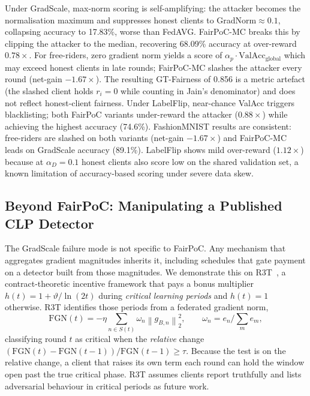 \documentclass[conference]{IEEEtran}
\theoremstyle{remark}
\begin{document}
Under GradScale, max-norm scoring is self-amplifying: the attacker
becomes the normalisation maximum and suppresses honest clients to
GradNorm$\approx 0.1$, collapsing accuracy to 17.83\%, worse than
FedAVG. FairPoC-MC breaks this by clipping the attacker to the median,
recovering 68.09\% accuracy at over-reward $0.78\times$.
For free-riders, zero gradient norm yields a score of
$\alpha_p \cdot \mathrm{ValAcc}_{\mathrm{global}}$ which may exceed
honest clients in late rounds; FairPoC-MC slashes the attacker every
round (net-gain $-1.67\times$). The resulting GT-Fairness of 0.856
is a metric artefact (the slashed client holds $r_i{=}0$ while
counting in Jain's denominator) and does not reflect honest-client
fairness. Under LabelFlip, near-chance ValAcc triggers blacklisting;
both FairPoC variants under-reward the attacker ($0.88\times$) while
achieving the highest accuracy (74.6\%).
FashionMNIST results are consistent: free-riders are slashed on both
variants (net-gain $-1.67\times$) and FairPoC-MC leads on GradScale
accuracy (89.1\%). LabelFlip shows mild over-reward ($1.12\times$)
because at $\alpha_D = 0.1$ honest clients also score low on the shared
validation set, a known limitation of accuracy-based scoring under
severe data skew.

\subsection{Beyond FairPoC: Manipulating a Published CLP Detector}
\label{subsec:clp}

The GradScale failure mode is not specific to FairPoC. Any mechanism that
aggregates gradient magnitudes inherits it, including schedules that gate
payment on a detector built from those magnitudes. We demonstrate this on
R3T~\cite{nguyen2026carpediem}, a contract-theoretic incentive framework
that pays a bonus multiplier $h(t) = 1 + \vartheta/\ln(2t)$ during
\emph{critical learning periods} and $h(t)=1$ otherwise. R3T identifies
those periods from a federated gradient norm,
\begin{equation}
\mathrm{FGN}(t) = -\eta \sum_{n \in S(t)} \omega_n
\left\lVert g_{B,n} \right\rVert_2^2 ,
\qquad \omega_n = e_n / \textstyle\sum_m e_m ,
\label{eq:fgn}
\end{equation}
classifying round $t$ as critical when the \emph{relative} change
$(\mathrm{FGN}(t)-\mathrm{FGN}(t{-}1))/\mathrm{FGN}(t{-}1) \geq \tau$.
Because the test is on the relative change, a client that raises its own
term each round can hold the window open past the true critical phase.
R3T assumes clients report truthfully and lists adversarial behaviour in
critical periods as future work.
\end{document}
